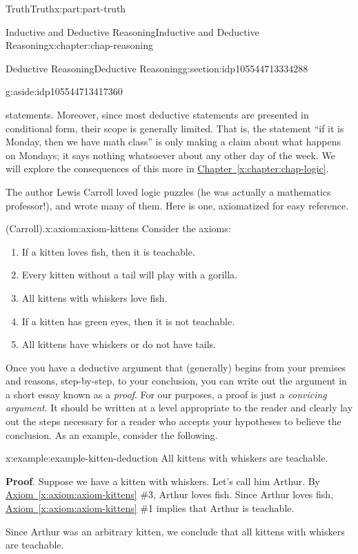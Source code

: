 \documentclass[oneside,10pt,]{book}
\newcommand{\xreffont}{\relax}
\newcommand{\terminology}[1]{\textbf{#1}}
\numberwithin{equation}{section}
\begin{document}
\begin{partptx}{Truth}{}{Truth}{}{}{x:part:part-truth}
\begin{chapterptx}{Inductive and Deductive Reasoning}{}{Inductive and Deductive Reasoning}{}{}{x:chapter:chap-reasoning}
\begin{sectionptx}{Deductive Reasoning}{}{Deductive Reasoning}{}{}{g:section:idp105544713334288}
\begin{aside}{}{g:aside:idp105544713417360}
\end{aside}
 statements. Moreover, since most deductive statements are presented in conditional form, their scope is generally limited. That is, the statement ``if it is Monday, then we have math class'' is only making a claim about what happens on Mondays; it says nothing whatsoever about any other day of the week. We will explore the consequences of this more in \hyperref[x:chapter:chap-logic]{Chapter~{\xreffont\ref{x:chapter:chap-logic}}}.%
\par
The author Lewis Carroll loved logic puzzles (he was actually a mathematics professor!), and wrote many of them. Here is one, axiomatized for easy reference.%
\begin{axiom}{(Carroll).}{}{x:axiom:axiom-kittens}%
Consider the axioms:%
%
\begin{enumerate}
\item{}If a kitten loves fish, then it is teachable.%
\item{}Every kitten without a tail will play with a gorilla.%
\item{}All kittens with whiskers love fish.%
\item{}If a kitten has green eyes, then it is not teachable.%
\item{}All kittens have whiskers or do not have tails.%
\end{enumerate}
\end{axiom}
Once you have a deductive argument that (generally) begins from your premises and reasons, step-by-step, to your conclusion, you can write out the argument in a short essay known as a \emph{proof}. For our purposes, a proof is just a \emph{convicing argument}. It should be written at a level appropriate to the reader and clearly lay out the steps necessary for a reader who accepts your hypotheses to believe the conclusion. As an example, consider the following.%
\begin{example}{}{x:example:example-kitten-deduction}%
All kittens with whiskers are teachable.%
\par
\terminology{Proof}. Suppose we have a kitten with whiskers. Let's call him Arthur. By \hyperref[x:axiom:axiom-kittens]{Axiom~{\xreffont\ref{x:axiom:axiom-kittens}}} \#3, Arthur loves fish. Since Arthur loves fish, \hyperref[x:axiom:axiom-kittens]{Axiom~{\xreffont\ref{x:axiom:axiom-kittens}}} \#1 implies that Arthur is teachable.%
\par
Since Arthur was an arbitrary kitten, we conclude that all kittens with whiskers are teachable.%
\end{example}

\end{sectionptx}
\end{chapterptx}
\end{partptx}
\end{document}

